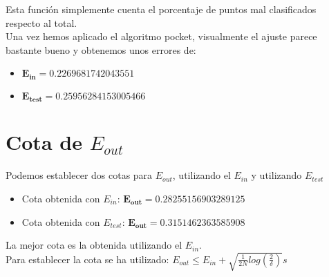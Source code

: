 Esta función simplemente cuenta el porcentaje de puntos mal clasificados respecto al total.\\
Una vez hemos aplicado el algoritmo pocket, visualmente el ajuste parece bastante bueno y obtenemos unos errores de:
\begin{itemize}
   \item $ \mathbf{E_{in} = 0.2269681742043551} $
   \item $  \mathbf{E_{test} = 0.25956284153005466} $
\end{itemize}

\section{Cota de $ E_{out} $}
Podemos establecer dos cotas para $ E_{out} $, utilizando el $ E_{in} $ y utilizando $ E_{test} $
\begin{itemize}
   \item Cota obtenida con $ E_{in} $: $ \mathbf{E_{out} = 0.28255156903289125} $
   \item Cota obtenida con $ E_{test} $: $ \mathbf{E_{out} = 0.3151462363585908} $
\end{itemize}

La mejor cota es la obtenida utilizando el $ E_{in} $.\\
Para establecer la cota se ha utilizado: $ E_{out} \leq E_{in} + \sqrt{\frac{1}{2N}log(\frac{2}{\delta})}s $

